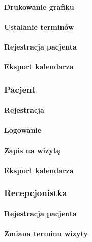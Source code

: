 \documentclass[polish,12pt]{aghthesis}
\begin{document}
\paragraph{Drukowanie grafiku}{}
\paragraph{Ustalanie terminów}{}
\paragraph{Rejestracja pacjenta}{}
\paragraph{Eksport kalendarza}{}
\subsubsection{Pacjent}
\paragraph{Rejestracja}{}
\paragraph{Logowanie}{}
\paragraph{Zapis na wizytę}{}
\paragraph{Eksport kalendarza}{}
\subsubsection{Recepcjonistka}
\paragraph{Rejestracja pacjenta}{}
\paragraph{Zmiana terminu wizyty}{}


\nocite{artykul2011,ksiazka2011,narzedzie2011,projekt2011}


\end{document}
